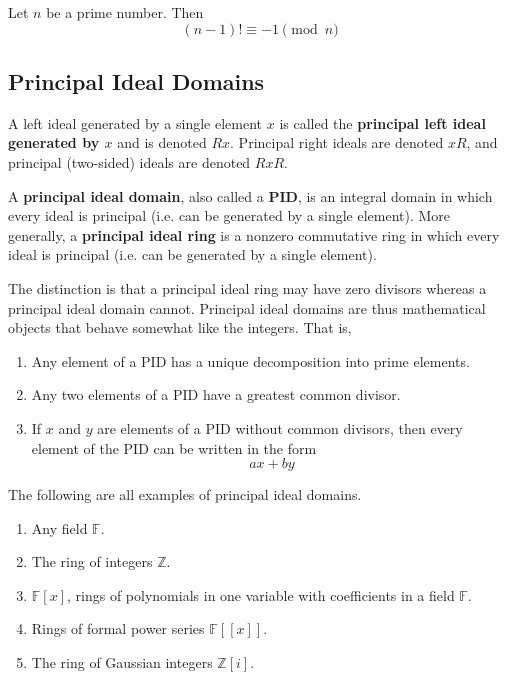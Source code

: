   \begin{theorem}
    Let $n$ be a prime number. Then 
    \begin{equation}
      (n-1)! \equiv -1 \pmod{n}
    \end{equation}
  \end{theorem}

\subsection{Principal Ideal Domains} 

  \begin{definition}
    A left ideal generated by a single element $x$ is called the \textbf{principal left ideal generated by $x$} and is denoted $R x$. Principal right ideals are denoted $x R$, and principal (two-sided) ideals are denoted $R x R$. 
  \end{definition}

  \begin{definition}
    A \textbf{principal ideal domain}, also called a \textbf{PID}, is an integral domain in which every ideal is principal (i.e. can be generated by a single element). More generally, a \textbf{principal ideal ring} is a nonzero commutative ring in which every ideal is principal (i.e. can be generated by a single element). 
  \end{definition}

  The distinction is that a principal ideal ring may have zero divisors whereas a principal ideal domain cannot. Principal ideal domains are thus mathematical objects that behave somewhat like the integers. That is, 
  \begin{enumerate}
    \item Any element of a PID has a unique decomposition into prime elements. 
    \item Any two elements of a PID have a greatest common divisor. 
    \item If $x$ and $y$ are elements of a PID without common divisors, then every element of the PID can be written in the form 
      \begin{equation}
        a x + b y
      \end{equation}
  \end{enumerate}

  \begin{example}
    The following are all examples of principal ideal domains. 
    \begin{enumerate}
      \item Any field $\mathbb{F}$. 
      \item The ring of integers $\mathbb{Z}$. 
      \item $\mathbb{F}[x]$, rings of polynomials in one variable with coefficients in a field $\mathbb{F}$. 
      \item Rings of formal power series $\mathbb{F}[[x]]$. 
      \item The ring of Gaussian integers $\mathbb{Z}[i]$. 
    \end{enumerate}
  \end{example}

